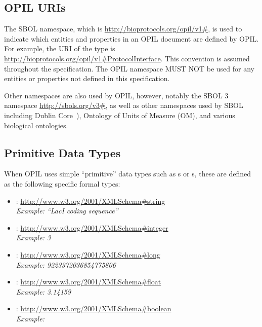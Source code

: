 \subsection{OPIL URIs}
 \label{sec:sbolURIs}
  
The SBOL namespace, which is \url{http://bioprotocols.org/opil/v1\#}, is used to indicate which entities and properties in an OPIL document are defined by OPIL. 
For example, the URI of the type  is \url{http://bioprotocols.org/opil/v1\#ProtocolInterface}. 
This convention is assumed throughout the specification.
The OPIL namespace MUST NOT be used for any entities or properties not defined in this specification.  

Other namespaces are also used by OPIL, however, notably the SBOL 3 namespace \url{http://sbols.org/v3\#}, as well as other namespaces used by SBOL including Dublin Core~\citep{dcmi2012}), Ontology of Units of Measure (OM), and various biological ontologies.


\subsection{Primitive Data Types}
\label{sec:datatypes}
\label{sec:string}
\label{sec:integer}
\label{sec:long}
\label{sec:float}
\label{sec:boolean}
\label{sec:URI}
\label{sec:literal}

When OPIL uses simple ``primitive'' data types such as s or s, these are defined as the following specific formal types:
\begin{itemize}
\item {}: \url{http://www.w3.org/2001/XMLSchema\#string}\\
  {\em Example: ``LacI coding sequence''}
\item {}: \url{http://www.w3.org/2001/XMLSchema\#integer}\\
  {\em Example: 3}
\item {}: \url{http://www.w3.org/2001/XMLSchema\#long}\\
  {\em Example: 9223372036854775806}
\item {}: \url{http://www.w3.org/2001/XMLSchema\#float}\\
  {\em Example: 3.14159}
\item {}: \url{http://www.w3.org/2001/XMLSchema\#boolean}\\
  {\em Example: }
\end{itemize}

